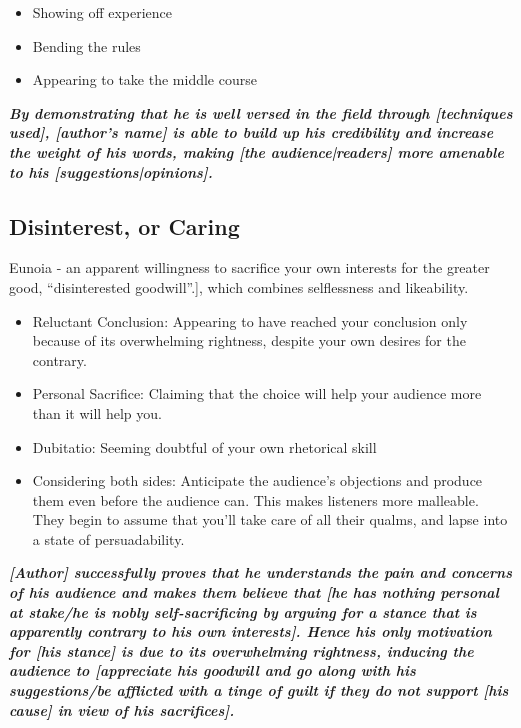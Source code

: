 \begin{itemize}
	\item Showing off experience
	\item Bending the rules
	\item Appearing to take the middle course
\end{itemize}

\textbf{\emph{By demonstrating that he is well versed in the field through [techniques used], [author's name] is able to build up his credibility and increase the weight of his words, making [the audience|readers] more amenable to his [suggestions|opinions].}}

\subsection{Disinterest, or Caring}
Eunoia - an apparent willingness to sacrifice your own interests for the greater good, ``disinterested goodwill''.], which combines selflessness and likeability.
\begin{itemize}
	\item Reluctant Conclusion: Appearing to have reached your conclusion only because of its overwhelming rightness, despite your own desires for the contrary.
	\item Personal Sacrifice: Claiming that the choice will help your audience more than it will help you.
	\item Dubitatio: Seeming doubtful of your own rhetorical skill
	\item Considering both sides: Anticipate the audience's objections and produce them even before the audience can. This makes listeners more malleable. They begin to assume that you'll take care of all their qualms, and lapse into a state of persuadability.
\end{itemize}

\textbf{\emph{[Author] successfully proves that he understands the pain and concerns of his audience and makes them believe that [he has nothing personal at stake/he is nobly self-sacrificing by arguing for a stance that is apparently contrary to his own interests]. Hence his only motivation for [his stance] is due to its overwhelming rightness, inducing the audience to [appreciate his goodwill and go along with his suggestions/be afflicted with a tinge of guilt if they do not support [his cause] in view of his sacrifices].}}


